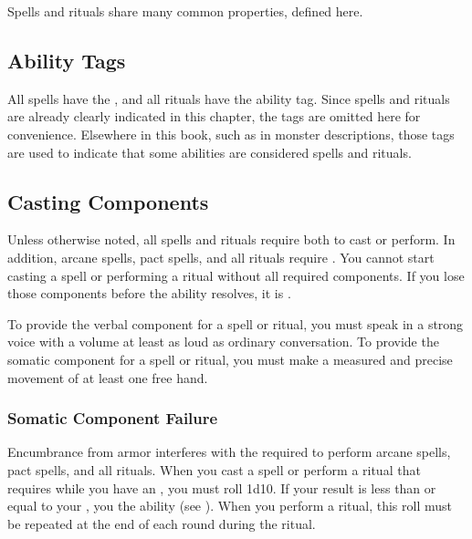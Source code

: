     Spells and rituals share many common properties, defined here.

    \subsection{Ability Tags}
        All spells have the  , and all rituals have the  ability tag.
        Since spells and rituals are already clearly indicated in this chapter, the tags are omitted here for convenience.
        Elsewhere in this book, such as in monster descriptions, those tags are used to indicate that some abilities are considered spells and rituals.

    \subsection{Casting Components}\label{Casting Components}
        Unless otherwise noted, all spells and rituals require both  to cast or perform.
        In addition, arcane spells, pact spells, and all rituals require .
        You cannot start casting a spell or performing a ritual without all required components.
        If you lose those components before the ability resolves, it is .

        To provide the verbal component for a spell or ritual, you must speak in a strong voice with a volume at least as loud as ordinary conversation.
        To provide the somatic component for a spell or ritual, you must make a measured and precise movement of at least one free hand.

        \subsubsection{Somatic Component Failure}\label{Somatic Component Failure}
            Encumbrance from armor interferes with the  required to perform arcane spells, pact spells, and all rituals.
            When you cast a spell or perform a ritual that requires  while you have an , you must roll 1d10.
            If your result is less than or equal to your , you  the ability (see ).
            When you perform a ritual, this roll must be repeated at the end of each round during the ritual.

